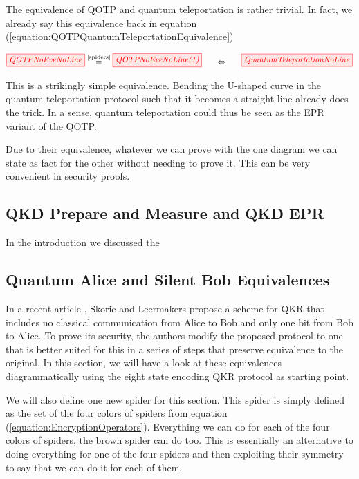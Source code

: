\documentclass[]{article}
\newcommand{\equaltext}[1]{\ensuremath{\stackrel{\text{#1}}{=}}}
\begin{document}
The equivalence of QOTP and quantum teleportation is rather trivial. In fact, we already say this equivalence back in equation (\ref{equation:QOTPQuantumTeleportationEquivalence})

\begin{equation}
\tikzfig{QOTPNoEveNoLine} \equaltext{\ref{spiders}} \tikzfig{QOTPNoEveNoLine(1)}~~~~~ \Leftrightarrow ~~~~~\tikzfig{QuantumTeleportationNoLine}
\end{equation}

This is a strikingly simple equivalence. Bending the U-shaped curve in the quantum teleportation protocol such that it becomes a straight line already does the trick. In a sense, quantum teleportation could thus be seen as the EPR variant of the QOTP. 

Due to their equivalence, whatever we can prove with the one diagram we can state as fact for the other without needing to prove it. This can be very convenient in security proofs.

\subsection{QKD Prepare and Measure and QKD EPR}

In the introduction we discussed the

\subsection{Quantum Alice and Silent Bob Equivalences}

In a recent article \cite{Leermakers2019}, Skori$\check{\textrm{c}}$ and Leermakers propose a scheme for QKR that includes no classical communication from Alice to Bob and only one bit from Bob to Alice. To prove its security, the authors modify the proposed protocol to one that is better suited for this in a series of steps that preserve equivalence to the original. In this section, we will have a look at these equivalences diagrammatically using the eight state encoding QKR protocol as starting point. 

We will also define one new spider for this section. This spider is simply defined as the set of the four colors of spiders from  equation (\ref{equation:EncryptionOperators}). Everything we can do for each of the four colors of spiders, the brown spider can do too. This is essentially an alternative to doing everything for one of the four spiders and then exploiting their symmetry to say that we can do it for each of them.
\end{document}
